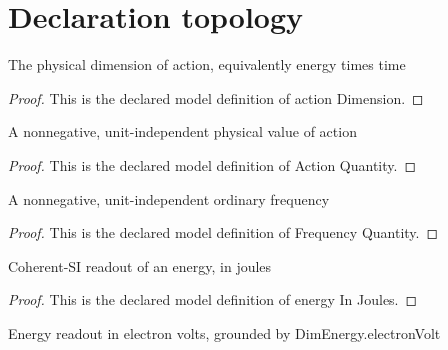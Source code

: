 \section{Declaration topology}
\begin{definition}
  \label{def:physics:phyx-mini-0517:phyxminiproblems-problemphyxmini0517-actiondimension}
  The physical dimension of action, equivalently energy times time
\end{definition}
\begin{proof}
  This is the declared model definition of action Dimension.
\end{proof}
\begin{definition}
  \label{def:physics:phyx-mini-0517:phyxminiproblems-problemphyxmini0517-actionquantity}
  A nonnegative, unit-independent physical value of action
\end{definition}
\begin{proof}
  This is the declared model definition of Action Quantity.
\end{proof}
\begin{definition}
  \label{def:physics:phyx-mini-0517:phyxminiproblems-problemphyxmini0517-frequencyquantity}
  A nonnegative, unit-independent ordinary frequency
\end{definition}
\begin{proof}
  This is the declared model definition of Frequency Quantity.
\end{proof}
\begin{definition}
  \label{def:physics:phyx-mini-0517:phyxminiproblems-problemphyxmini0517-energyinjoules}
  Coherent-SI readout of an energy, in joules
\end{definition}
\begin{proof}
  This is the declared model definition of energy In Joules.
\end{proof}
\begin{definition}
  \label{def:physics:phyx-mini-0517:phyxminiproblems-problemphyxmini0517-energyinelectronvolts}
  Energy readout in electron volts, grounded by DimEnergy.electronVolt
\end{definition}
